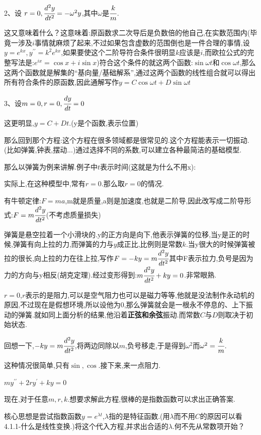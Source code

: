 \documentclass[UTF8,12pt]{ctexbook}
\newcommand{\derivative}{^\prime}
\newcommand{\doubleDerivative}{^{\prime\prime}}
\begin{document}
{{{{2、设 $r = 0, \cfrac{d^2y}{dt^2} = -\omega^2y$,其中$\omega$是$\cfrac{k}{m}$.

这又意味着什么？这意味着:原函数求二次导后是负数倍的他自己,在实数范围内(毕竟一涉及$i$事情就麻烦了起来,不过如果包含虚数的范围倒也是一件合理的事情,设$y=e^{kx},y\doubleDerivative = k^{2}e^{kx}$,如果要使这个二阶导符合条件很明显$k$应该是$i$,而欧拉公式的完整写法是:$e^{ix} = \cos x + i\sin x$)符合这个条件的就这两个函数:$\sin\omega t$和$\cos\omega t$,那么这两个函数就是解集的“基向量/基础解系”,通过这两个函数的线性组合就可以得出所有符合条件的原函数,因此通解写作$y = C\cos\omega t + D\sin\omega t$

3、设$m = 0, r = 0, \cfrac{dy}{dt} = 0$

这更明显,$y = C + Dt$.(y是个函数,表示位置)

那么回到那个方程:这个方程在很多领域都是很常见的.这个方程能表示一切振动.(比如弹簧,钟表,摆动...)通过选择不同的系数,可以建立各种最简洁的基础模型.

那么以弹簧为例来讲解.例子中$t$表示时间(这就是为什么不用x):

实际上,在这种模型中,常有$r = 0$.那么取$ r = 0$的情况.

有牛顿定律:$F = ma$,m就是质量,a则是加速度,也就是二阶导,因此改写成二阶导形式:$F = m\cfrac{d^2y}{dt^2}$(不考虑质量损失)

弹簧是悬空拉着一个小滑块的.y的正方向是向下,他表示弹簧的位移,当y是正的时候,弹簧有向上拉的力,而弹簧的力与$y$成正比,比例则是常数$k$.当y很大的时候弹簧被拉的很长,向上拉的力在往上拉,写作$F = -ky = m\cfrac{d^2y}{dt^2}$其中F表示拉力,负号是因为力的方向与y相反(胡克定理).经过变形得到:$m\cfrac{d^2y}{dt^2} + ky = 0$.非常眼熟.

$r = 0$,$r$表示的是阻力,可以是空气阻力也可以是磁力等等,他就是没法制作永动机的原因,不过现在是假想环境,所以设他为0,那么弹簧就会是一根永不停息的、上下振动的弹簧.就如同上面分析的结果,他沿着{\bfseries 正弦和余弦}振动.而常数$C$与$D$则取决于初始状态.

回想一下,$-ky = m\cfrac{d^2y}{dt^2}$,将两边同除以$m$,负号移走,于是得到$\omega^2$而$\omega^2 = \cfrac{k}{m}$.

这种情况很简单,只有$\sin , \cos$.接下来,来一点阻力.

$my\doubleDerivative + 2ry\derivative + ky = 0$

现在,对于任意$m,r,k$.想要求解此方程,很棒的是指数函数可以求出正确答案.

核心思想是尝试指数函数$y = e^{\lambda t}$,$\lambda$指的是特征函数.(用$\lambda$而不用$C$的原因可以看4.1.1-什么是线性变换.)将这个代入方程,并求出合适的$\lambda$.何不先从常数项开始？

}}}}
\end{document}
